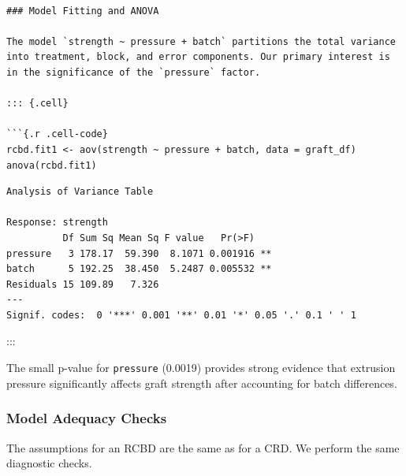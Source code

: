 \documentclass[
  letterpaper,
  DIV=11,
  numbers=noendperiod]{scrreprt}
\begin{document}
\begin{verbatim}

### Model Fitting and ANOVA

The model `strength ~ pressure + batch` partitions the total variance into treatment, block, and error components. Our primary interest is in the significance of the `pressure` factor.

::: {.cell}

```{.r .cell-code}
rcbd.fit1 <- aov(strength ~ pressure + batch, data = graft_df)
anova(rcbd.fit1)
\end{verbatim}

\begin{verbatim}
Analysis of Variance Table

Response: strength
          Df Sum Sq Mean Sq F value   Pr(>F)   
pressure   3 178.17  59.390  8.1071 0.001916 **
batch      5 192.25  38.450  5.2487 0.005532 **
Residuals 15 109.89   7.326                    
---
Signif. codes:  0 '***' 0.001 '**' 0.01 '*' 0.05 '.' 0.1 ' ' 1
\end{verbatim}

:::

The small p-value for \texttt{pressure} (0.0019) provides strong
evidence that extrusion pressure significantly affects graft strength
after accounting for batch differences.

\subsubsection{Model Adequacy Checks}\label{model-adequacy-checks}

The assumptions for an RCBD are the same as for a CRD. We perform the
same diagnostic checks.
\end{document}
